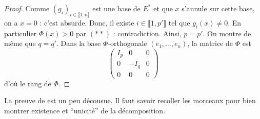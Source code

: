 \begin{proof}
    Comme $(g_i)_{i \in \llbracket 1, n \rrbracket}$ est une base de $E^*$ et que $x$ s'annule sur cette base, on a $x = 0$ : c'est absurde. Donc, il existe $i \in \llbracket 1, p' \rrbracket$ tel que $g_i(x) \neq 0$. En particulier $\Phi(x) > 0$ par $(**)$ : contradiction. Ainsi, $p = p'$. On montre de même que $q = q'$.
    \newpar
    Dans la base $\Phi$-orthogonale $(e_1, \dots, e_n)$, la matrice de $\Phi$ est
    \[ \begin{pmatrix}
      I_p & 0 & 0 \\
      0 & -I_q & 0 \\
      0 & 0 & 0
    \end{pmatrix} \]
    d'où le rang de $\Phi$.
  \end{proof}

  \begin{remark}
    La preuve de \cite{[GOU21]} est un peu décousue. Il faut savoir recoller les morceaux pour bien montrer existence et ``unicité'' de la décomposition.
  \end{remark}


